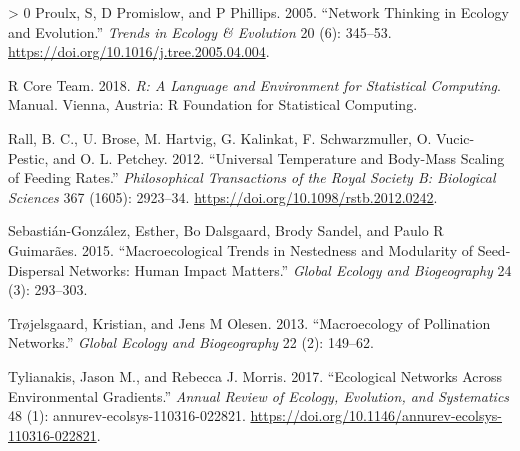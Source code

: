 \documentclass[11pt]{article}
\newlength{\cslhangindent}
\newenvironment{CSLReferences}[3] %
 {%
  \setlength{\parindent}{0pt}
  \ifodd #1 \everypar{\setlength{\hangindent}{\cslhangindent}}\ignorespaces\fi
  \ifnum #2 > 0
  \setlength{\parskip}{#2\baselineskip}
  \fi
 }%
 {}
\begin{document}
\begin{CSLReferences}{1}{0}
\leavevmode\hypertarget{ref-Proulx2005NetThi}{}%
Proulx, S, D Promislow, and P Phillips. 2005. {``Network Thinking in
Ecology and Evolution.''} \emph{Trends in Ecology \& Evolution} 20 (6):
345--53. \url{https://doi.org/10.1016/j.tree.2005.04.004}.

\leavevmode\hypertarget{ref-RCoreTeam2018RLan}{}%
R Core Team. 2018. \emph{R: A Language and Environment for Statistical
Computing}. Manual. Vienna, Austria: R Foundation for Statistical
Computing.

\leavevmode\hypertarget{ref-Rall2012UniTem}{}%
Rall, B. C., U. Brose, M. Hartvig, G. Kalinkat, F. Schwarzmuller, O.
Vucic-Pestic, and O. L. Petchey. 2012. {``Universal Temperature and
Body-Mass Scaling of Feeding Rates.''} \emph{Philosophical Transactions
of the Royal Society B: Biological Sciences} 367 (1605): 2923--34.
\url{https://doi.org/10.1098/rstb.2012.0242}.

\leavevmode\hypertarget{ref-Sebastian-Gonzalez2015MacTre}{}%
Sebastián-González, Esther, Bo Dalsgaard, Brody Sandel, and Paulo R
Guimarães. 2015. {``Macroecological Trends in Nestedness and Modularity
of Seed-Dispersal Networks: Human Impact Matters.''} \emph{Global
Ecology and Biogeography} 24 (3): 293--303.

\leavevmode\hypertarget{ref-Trojelsgaard2013MacPol}{}%
Trøjelsgaard, Kristian, and Jens M Olesen. 2013. {``Macroecology of
Pollination Networks.''} \emph{Global Ecology and Biogeography} 22 (2):
149--62.

\leavevmode\hypertarget{ref-Tylianakis2017EcoNet}{}%
Tylianakis, Jason M., and Rebecca J. Morris. 2017. {``Ecological
Networks Across Environmental Gradients.''} \emph{Annual Review of
Ecology, Evolution, and Systematics} 48 (1):
annurev-ecolsys-110316-022821.
\url{https://doi.org/10.1146/annurev-ecolsys-110316-022821}.

\end{CSLReferences}
\end{document}
